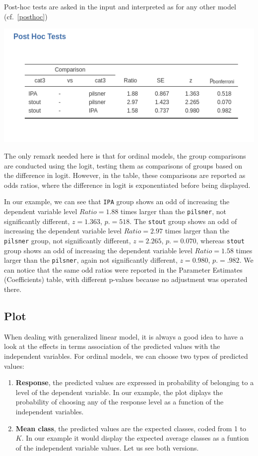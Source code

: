 \documentclass[
]{book}
\providecommand{\tightlist}{%
  \setlength{\itemsep}{0pt}\setlength{\parskip}{0pt}}
\begin{document}
Post-hoc tests are asked in the input and interpreted as for any other model (cf.~\ref{posthoc})

\includegraphics{bookletpics/3_ordinal_output6.png}

The only remark needed here is that for ordinal models, the group comparisons are conducted using the logit, testing them as comparisons of groups based on the difference in logit. However, in the table, these comparisons are reported as odds ratios, where the difference in logit is exponentiated before being displayed.

In our example, we can see that \texttt{IPA} group shows an odd of increasing the dependent variable level \(Ratio=1.88\) times larger than the \texttt{pilsner}, not significantly different, \(z=1.363\), \(p.=518\). The \texttt{stout} group shows an odd of increasing the dependent variable level \(Ratio=2.97\) times larger than the \texttt{pilsner} group, not significantly different, \(z=2.265\), \(p.=0.070\), whereas \texttt{stout} group shows an odd of increasing the dependent variable level \(Ratio=1.58\) times larger than the \texttt{pilsner}, again not significantly different, \(z=0.980\), \(p.=.982\). We can notice that the same odd ratios were reported in the {Parameter Estimates (Coefficients)} table, with different p-values because no adjustment was operated there.

\hypertarget{plot-1}{%
\subsection{Plot}\label{plot-1}}

When dealing with generalized linear model, it is always a good idea to have a look at the effects in terms association of the predicted values with the independent variables. For ordinal models, we can choose two types of predicted values:

\begin{enumerate}
\def\labelenumi{\arabic{enumi})}
\tightlist
\item
  \textbf{Response}, the predicted values are expressed in probability of belonging to a level of the dependent variable. In our example, the plot diplays the probability of choosing any of the response level as a function of the independent variables.
\item
  \textbf{Mean class}, the predicted values are the expected classes, coded from 1 to \(K\). In our example it would display the expected average classes as a funtion of the independent variable values. Let us see both versions.
\end{enumerate}
\end{document}
